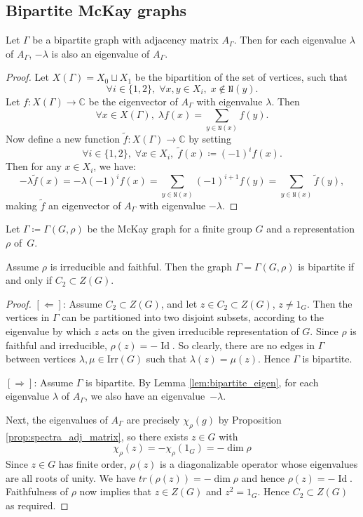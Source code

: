 \documentclass[ALCO]{cedram}
\newcommand{\id}{\operatorname{Id}}
\newcommand{\C}{{\mathbb C}}
\begin{document}
\subsection{Bipartite McKay graphs}
\begin{lemma}\label{lem:bipartite_eigen}
 Let $\Gamma$ be a bipartite graph with adjacency matrix $A_{\Gamma}$. Then for each eigenvalue $\lambda$ of $A_{\Gamma}$, $-\lambda$ is also an eigenvalue of $A_{\Gamma}$.
\end{lemma}
\begin{proof}
 Let $X(\Gamma) = X_0 \sqcup X_1$ be the bipartition of the set of vertices, such that $$\forall i\in \{1,2\}, \; \forall x, y \in X_i, \; x\notin \mathtt{N}(y).$$ Let $f: X(\Gamma) \to \C$ be the eigenvector of $A_{\Gamma}$ with eigenvalue $\lambda$. Then $$\forall x\in X(\Gamma), \; \lambda f(x) = \sum_{y \in \mathtt{N}(x)} f(y).$$ Now define a new function $\tilde{f}: X(\Gamma) \to \C$ by setting $$\forall i\in \{1,2\}, \; \forall x\in X_i, \; \tilde{f}(x) \coloneqq  (-1)^i f(x).$$ Then for any $x\in X_i$, we have: 
 $$-\lambda \tilde{f}(x) = -\lambda (-1)^i f(x) = \sum_{y \in \mathtt{N}(x)}(-1)^{i+1} f(y) =  \sum_{y \in \mathtt{N}(x)} \tilde{f}(y),$$ making $\tilde{f}$ an eigenvector of $A_{\Gamma}$ with eigenvalue $-\lambda$.
\end{proof}

Let $\Gamma \coloneqq  \Gamma(G, \rho)$ be the McKay graph for a finite group $G$ and a representation $\rho$ of~$G$.
\begin{lemma}\label{lem:bipartite_center}

 Assume $\rho$ is irreducible and faithful. Then the graph $\Gamma= \Gamma(G, \rho)$ is bipartite if and only if $C_2 \subset Z(G)$. 
\end{lemma}

\begin{proof}

$[\mathbf{\Leftarrow}]$: Assume $C_2 \subset Z(G)$, and let $z\in C_2\subset Z(G)$, $z\neq 1_G $. Then the vertices in $\Gamma$ can be partitioned into two disjoint subsets, according to the eigenvalue by which $z$ acts on the given irreducible representation of $G$. Since $\rho$ is faithful and irreducible, $\rho(z) =-\id$. So clearly, there are no edges in $\Gamma$ between vertices $\lambda, \mu \in \mathrm{Irr}(G)$ such that $\lambda(z) = \mu(z)$. Hence $\Gamma$ is bipartite.

 $[\mathbf{\Rightarrow}]$: Assume $\Gamma$ is bipartite. By Lemma \ref{lem:bipartite_eigen}, for each eigenvalue $\lambda$ of $A_{\Gamma}$, we also have an eigenvalue~$-\lambda$.  
 
 
 Next, the eigenvalues of $A_{\Gamma}$ are precisely $\chi_\rho(g)$ by Proposition \ref{prop:spectra_adj_matrix}, so there exists $z \in G$ with 
 $$\chi_\rho(z) = -\chi_{\rho}(1_G) = - \dim \rho$$
 Since $z \in G$ has finite order, $\rho(z)$ is a diagonalizable operator whose eigenvalues are all roots of unity. We have $tr(\rho(z)) = - \dim \rho$ and hence $\rho(z) = -\id$. Faithfulness of $\rho$ now implies that $z \in Z(G)$ and $z^2 = 1_G$. Hence $C_2 \subset Z(G)$ as required.
 
\end{proof}
\end{document}
